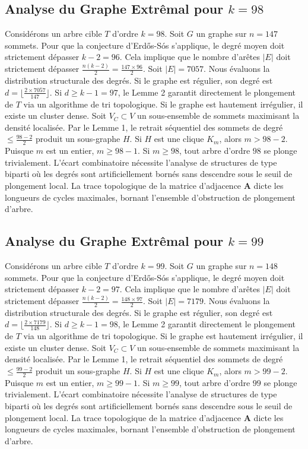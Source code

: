 \documentclass[11pt,a4paper]{article}
\begin{document}
\subsection{Analyse du Graphe Extr\^emal pour $k=98$}
Consid\'erons un arbre cible $T$ d'ordre $k=98$.
Soit $G$ un graphe sur $n=147$ sommets.
Pour que la conjecture d'Erd\H{o}s-S\'os s'applique, le degr\'e moyen doit strictement d\'epasser $k-2 = 96$.
Cela implique que le nombre d'ar\^etes $|E|$ doit strictement d\'epasser $\frac{n(k-2)}{2} = \frac{147 \times 96}{2}$.
Soit $|E| = 7057$.
Nous \'evaluons la distribution structurale des degr\'es. Si le graphe est r\'egulier, son degr\'e est $d = \lfloor \frac{2 \times 7057}{147} \rfloor$.
Si $d \geq k-1 = 97$, le Lemme 2 garantit directement le plongement de $T$ via un algorithme de tri topologique.
Si le graphe est hautement irr\'egulier, il existe un cluster dense. Soit $V_C \subset V$ un sous-ensemble de sommets maximisant la densit\'e localis\'ee.
Par le Lemme 1, le retrait s\'equentiel des sommets de degr\'e $\leq \frac{98-2}{2}$ produit un sous-graphe $H$.
Si $H$ est une clique $K_{m}$, alors $m > 98-2$. Puisque $m$ est un entier, $m \geq 98-1$. Si $m \geq 98$, tout arbre d'ordre $98$ se plonge trivialement.
L'\'ecart combinatoire n\'ecessite l'analyse de structures de type biparti o\`u les degr\'es sont artificiellement born\'es sans descendre sous le seuil de plongement local. La trace topologique de la matrice d'adjacence $\mathbf{A}$ dicte les longueurs de cycles maximales, bornant l'ensemble d'obstruction de plongement d'arbre.


\subsection{Analyse du Graphe Extr\^emal pour $k=99$}
Consid\'erons un arbre cible $T$ d'ordre $k=99$.
Soit $G$ un graphe sur $n=148$ sommets.
Pour que la conjecture d'Erd\H{o}s-S\'os s'applique, le degr\'e moyen doit strictement d\'epasser $k-2 = 97$.
Cela implique que le nombre d'ar\^etes $|E|$ doit strictement d\'epasser $\frac{n(k-2)}{2} = \frac{148 \times 97}{2}$.
Soit $|E| = 7179$.
Nous \'evaluons la distribution structurale des degr\'es. Si le graphe est r\'egulier, son degr\'e est $d = \lfloor \frac{2 \times 7179}{148} \rfloor$.
Si $d \geq k-1 = 98$, le Lemme 2 garantit directement le plongement de $T$ via un algorithme de tri topologique.
Si le graphe est hautement irr\'egulier, il existe un cluster dense. Soit $V_C \subset V$ un sous-ensemble de sommets maximisant la densit\'e localis\'ee.
Par le Lemme 1, le retrait s\'equentiel des sommets de degr\'e $\leq \frac{99-2}{2}$ produit un sous-graphe $H$.
Si $H$ est une clique $K_{m}$, alors $m > 99-2$. Puisque $m$ est un entier, $m \geq 99-1$. Si $m \geq 99$, tout arbre d'ordre $99$ se plonge trivialement.
L'\'ecart combinatoire n\'ecessite l'analyse de structures de type biparti o\`u les degr\'es sont artificiellement born\'es sans descendre sous le seuil de plongement local. La trace topologique de la matrice d'adjacence $\mathbf{A}$ dicte les longueurs de cycles maximales, bornant l'ensemble d'obstruction de plongement d'arbre.
\end{document}
